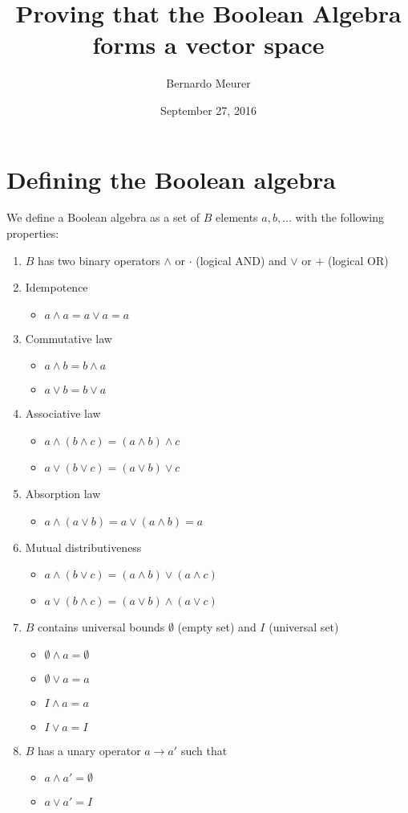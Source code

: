\documentclass{article}
\title{Proving that the Boolean Algebra forms a vector space}
\date{September 27, 2016}
\author{Bernardo Meurer}
\begin{document}
\maketitle
\newpage
\section{Defining the Boolean algebra}
\label{sec:Defining the Boolean algebra}

We define a Boolean algebra as a set of $B$ elements $a,b,\dots$ with the
following properties:

\begin{enumerate}
  \item $B$ has two binary operators $\wedge$ or $\cdot$ (logical AND) and
        $\vee$ or $+$ (logical OR)
  \item Idempotence
  \begin{itemize}
    \item $a\wedge a = a \vee a = a$
  \end{itemize}
  \item Commutative law
  \begin{itemize}
    \item $a \wedge b = b \wedge a$
    \item $a \vee b = b \vee a$
  \end{itemize}
  \item Associative law
  \begin{itemize}
    \item $a \wedge (b \wedge c) = (a \wedge b) \wedge c$
    \item $a \vee (b \vee c) = (a \vee b) \vee c$
  \end{itemize}
  \item Absorption law
  \begin{itemize}
    \item $a \wedge (a \vee b) = a \vee (a \wedge b) = a$
  \end{itemize}
  \item Mutual distributiveness
  \begin{itemize}
    \item $a \wedge (b \vee c) = (a \wedge b) \vee (a \wedge c)$
    \item $a \vee (b \wedge c) = (a \vee b) \wedge (a \vee c)$
  \end{itemize}
  \item $B$ contains universal bounds $\emptyset$ (empty set) and $I$
  (universal set)
  \begin{itemize}
    \item $\emptyset \wedge a = \emptyset$
    \item $\emptyset \vee a = a$
    \item $I \wedge a = a$
    \item $I \vee a = I$
  \end{itemize}
  \item $B$ has a unary operator $a\rightarrow a'$ such that
  \begin{itemize}
    \item $a \wedge a' = \emptyset$
    \item $a \vee a' = I$
  \end{itemize}
\end{enumerate}
\end{document}
